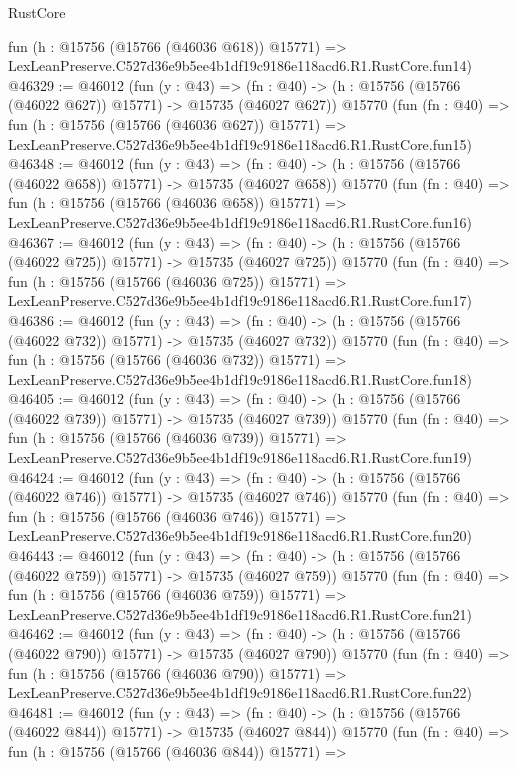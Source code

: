 \begin{lexlean}{RustCore}
\begin{coremodule}
    fun (h : @15756 (@15766 (@46036 @618)) @15771) =>
    LexLeanPreserve.C527d36e9b5ee4b1df19c9186e118acd6.R1.RustCore.fun14)
@46329 := @46012
    (fun (y : @43) =>
    (fn : @40) -> (h : @15756 (@15766 (@46022 @627)) @15771) -> @15735 (@46027 @627))
    @15770
    (fun (fn : @40) =>
    fun (h : @15756 (@15766 (@46036 @627)) @15771) =>
    LexLeanPreserve.C527d36e9b5ee4b1df19c9186e118acd6.R1.RustCore.fun15)
@46348 := @46012
    (fun (y : @43) =>
    (fn : @40) -> (h : @15756 (@15766 (@46022 @658)) @15771) -> @15735 (@46027 @658))
    @15770
    (fun (fn : @40) =>
    fun (h : @15756 (@15766 (@46036 @658)) @15771) =>
    LexLeanPreserve.C527d36e9b5ee4b1df19c9186e118acd6.R1.RustCore.fun16)
@46367 := @46012
    (fun (y : @43) =>
    (fn : @40) -> (h : @15756 (@15766 (@46022 @725)) @15771) -> @15735 (@46027 @725))
    @15770
    (fun (fn : @40) =>
    fun (h : @15756 (@15766 (@46036 @725)) @15771) =>
    LexLeanPreserve.C527d36e9b5ee4b1df19c9186e118acd6.R1.RustCore.fun17)
@46386 := @46012
    (fun (y : @43) =>
    (fn : @40) -> (h : @15756 (@15766 (@46022 @732)) @15771) -> @15735 (@46027 @732))
    @15770
    (fun (fn : @40) =>
    fun (h : @15756 (@15766 (@46036 @732)) @15771) =>
    LexLeanPreserve.C527d36e9b5ee4b1df19c9186e118acd6.R1.RustCore.fun18)
@46405 := @46012
    (fun (y : @43) =>
    (fn : @40) -> (h : @15756 (@15766 (@46022 @739)) @15771) -> @15735 (@46027 @739))
    @15770
    (fun (fn : @40) =>
    fun (h : @15756 (@15766 (@46036 @739)) @15771) =>
    LexLeanPreserve.C527d36e9b5ee4b1df19c9186e118acd6.R1.RustCore.fun19)
@46424 := @46012
    (fun (y : @43) =>
    (fn : @40) -> (h : @15756 (@15766 (@46022 @746)) @15771) -> @15735 (@46027 @746))
    @15770
    (fun (fn : @40) =>
    fun (h : @15756 (@15766 (@46036 @746)) @15771) =>
    LexLeanPreserve.C527d36e9b5ee4b1df19c9186e118acd6.R1.RustCore.fun20)
@46443 := @46012
    (fun (y : @43) =>
    (fn : @40) -> (h : @15756 (@15766 (@46022 @759)) @15771) -> @15735 (@46027 @759))
    @15770
    (fun (fn : @40) =>
    fun (h : @15756 (@15766 (@46036 @759)) @15771) =>
    LexLeanPreserve.C527d36e9b5ee4b1df19c9186e118acd6.R1.RustCore.fun21)
@46462 := @46012
    (fun (y : @43) =>
    (fn : @40) -> (h : @15756 (@15766 (@46022 @790)) @15771) -> @15735 (@46027 @790))
    @15770
    (fun (fn : @40) =>
    fun (h : @15756 (@15766 (@46036 @790)) @15771) =>
    LexLeanPreserve.C527d36e9b5ee4b1df19c9186e118acd6.R1.RustCore.fun22)
@46481 := @46012
    (fun (y : @43) =>
    (fn : @40) -> (h : @15756 (@15766 (@46022 @844)) @15771) -> @15735 (@46027 @844))
    @15770
    (fun (fn : @40) =>
    fun (h : @15756 (@15766 (@46036 @844)) @15771) =>

\end{coremodule}
\end{lexlean}
